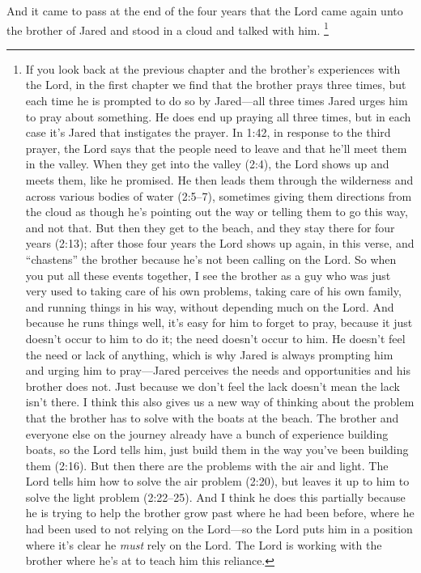 			And it came to pass at the end of the four years
			that the Lord came again unto the brother of Jared
			and stood in a cloud and talked with him.
			\footnote{%
				If you look back at the previous chapter and the brother's experiences with the Lord, in the first chapter we find that the brother prays three times, but each time he is prompted to do so by Jared---all three times Jared urges him to pray about something. He does end up praying all three times, but in each case it's Jared that instigates the prayer. In 1:42, in response to the third prayer, the Lord says that the people need to leave and that he'll meet them in the valley. When they get into the valley (2:4), the Lord shows up and meets them, like he promised. He then leads them through the wilderness and across various bodies of water (2:5--7), sometimes giving them directions from the cloud as though he's pointing out the way or telling them to go this way, and not that. But then they get to the beach, and they stay there for four years (2:13); after those four years the Lord shows up again, in this verse, and ``chastens'' the brother because he's not been calling on the Lord. 
				So when you put all these events together, I see the brother as a guy who was just very used to taking care of his own problems, taking care of his own family, and running things in his way, without depending much on the Lord. And because he runs things well, it's easy for him to forget to pray, because it just doesn't occur to him to do it; the need doesn't occur to him. He doesn't feel the need or lack of anything, which is why Jared is always prompting him and urging him to pray---Jared perceives the needs and opportunities and his brother does not. Just because we don't feel the lack doesn't mean the lack isn't there.
				I think this also gives us a new way of thinking about the problem that the brother has to solve with the boats at the beach. The brother and everyone else on the journey already have a bunch of experience building boats, so the Lord tells him, just build them in the way you've been building them (2:16). But then there are the problems with the air and light. The Lord tells him how to solve the air problem (2:20), but leaves it up to him to solve the light problem (2:22--25). And I think he does this partially because he is trying to help the brother grow past where he had been before, where he had been used to not relying on the Lord---so the Lord puts him in a position where it's clear he \textit{must} rely on the Lord. The Lord is working with the brother where he's at to teach him this reliance. 
}
